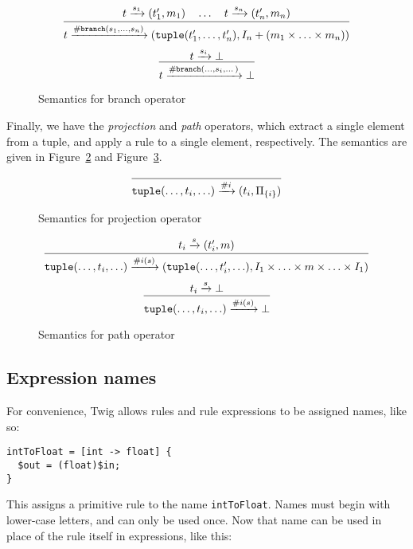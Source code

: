 \begin{figure}[ht]
\label{semantics:branch}
\[
\infer{
  t \arr{\mathtt{\#branch}(s_1,\ldots,s_n)}
  (\mathtt{tuple}(t_1',\ldots,t_n'),I_n + (m_1 \times \ldots \times m_n))
}{t \arr{s_1} (t_1',m_1) \quad \ldots \quad t \arr{s_n} (t_n',m_n)}
\]
\[
\infer
{t \arr{\mathtt{\#branch}(\ldots,s_i,\dots)} \bot}
{t \arr{s_i} \bot}
\]
\caption{Semantics for branch operator}
\end{figure}


Finally, we have the \emph{projection} and \emph{path} operators, which
extract a single element from a tuple, and apply a rule to a single element,
respectively. The semantics are given in Figure~\ref{semantics:projection} and
Figure~\ref{semantics:path}.


\begin{figure}[ht]
\label{semantics:projection}
\[
\infer{\mathtt{tuple}(\ldots,t_i,\ldots) \arr{\#i} 
(t_i,\Pi_{\{i\}})}{}
\]
\caption{Semantics for projection operator}
\end{figure}


\begin{figure}[ht]
\label{semantics:path}
\[
\infer{\mathtt{tuple}(\ldots,t_i,\ldots) \arr{\#i(s)}
(\mathtt{tuple}(\ldots,t_i',\ldots),
I_1 \times \ldots \times m \times \ldots \times I_1)}
{t_i \arr{s} (t_i',m)}
\]
\[
\infer{\mathtt{tuple}(\ldots,t_i,\ldots) \arr{\#i(s)} \bot}
{t_i \arr{s} \bot}
\]
\caption{Semantics for path operator}
\end{figure}


\subsection{Expression names}
\label{section:names}

For convenience, Twig allows rules and rule expressions to be assigned names,
like so:

\begin{verbatim}
intToFloat = [int -> float] {
  $out = (float)$in;
}
\end{verbatim}

This assigns a primitive rule to the name \texttt{intToFloat}. Names must
begin with lower-case letters, and can only be used once. Now that name can be
used in place of the rule itself in expressions, like this:

